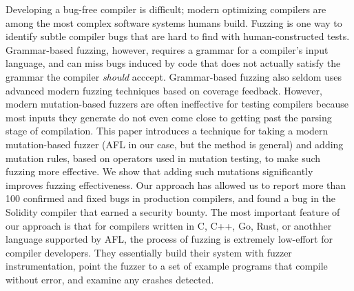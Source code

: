 Developing a bug-free compiler is difficult; modern optimizing compilers are among the most complex software systems humans build.  Fuzzing is one way to identify subtle compiler bugs that are hard to find with human-constructed tests.  Grammar-based fuzzing, however, requires a grammar for a compiler's input language, and can miss bugs induced by code that does not actually satisfy the grammar the compiler \emph{should} acccept.  Grammar-based fuzzing also seldom uses advanced modern fuzzing techniques based on coverage feedback.  However, modern mutation-based fuzzers are often ineffective for testing compilers because most inputs they generate do not even come close to getting past the parsing stage of compilation.   This paper introduces a technique for taking a modern mutation-based fuzzer (AFL in our case, but the method is general) and adding mutation rules, based on operators used in mutation testing, to make such fuzzing more effective.  We show that adding such mutations significantly improves fuzzing effectiveness.  Our approach has allowed us to report more than 100 confirmed and fixed bugs in production compilers, and found a bug in the Solidity compiler that earned a security bounty.  The most important feature of our approach is that for compilers written in C, C++, Go, Rust, or anothher language supported by AFL, the process of fuzzing is extremely low-effort for compiler developers.  They essentially build their system with fuzzer instrumentation, point the fuzzer to a set of example programs that compile without error, and examine any crashes detected.
